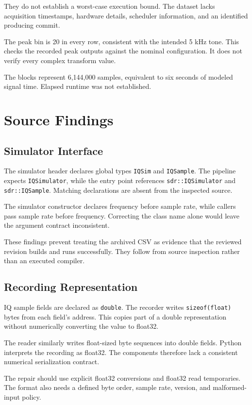 \documentclass[conference]{IEEEtran}
\begin{document}
They do not establish a worst-case execution bound.
The dataset lacks acquisition timestamps, hardware details,
scheduler information, and an identified producing commit.

The peak bin is 20 in every row, consistent with the intended
5 kHz tone. This checks the recorded peak outputs against
the nominal configuration. It does not verify every complex
transform value.

The blocks represent 6,144,000 samples, equivalent to six
seconds of modeled signal time. Elapsed runtime was not
established.

\section{Source Findings}

\subsection{Simulator Interface}

The simulator header declares global types
\texttt{IQSim} and \texttt{IQSample}.
The pipeline expects \texttt{IQSimulator}, while the entry
point references \texttt{sdr::IQSimulator} and
\texttt{sdr::IQSample}. Matching declarations are absent
from the inspected source.

The simulator constructor declares frequency before sample
rate, while callers pass sample rate before frequency.
Correcting the class name alone would leave the argument
contract inconsistent.

These findings prevent treating the archived CSV as
evidence that the reviewed revision builds and runs
successfully. They follow from source inspection rather
than an executed compiler.

\subsection{Recording Representation}

IQ sample fields are declared as \texttt{double}.
The recorder writes \texttt{sizeof(float)} bytes from each
field's address. This copies part of a double representation
without numerically converting the value to float32.

The reader similarly writes float-sized byte sequences
into double fields. Python interprets the recording as
float32. The components therefore lack a consistent
numerical serialization contract.

The repair should use explicit float32 conversions and
float32 read temporaries. The format also needs a defined
byte order, sample rate, version, and malformed-input
policy.
\end{document}
